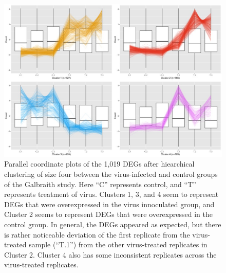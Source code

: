 \documentclass[11pt,a4paper,oldfontcommands,openany]{memoir}
\numberwithin{equation}{section} %
\begin{document}
\begin{figure}[H]
\centering
  \includegraphics[width=\textwidth]{../VirusHoneyBee/DESeq2/ClusterStandard/Clustering_data_FDR_05/C_T_4.jpg}
  \caption{Parallel coordinate plots of the 1,019 DEGs after hiearchical clustering of size four between the virus-infected and control groups of the Galbraith study. Here ``C'' represents control, and ``T'' represents treatment of virus. Clusters 1, 3, and 4 seem to represent DEGs that were overexpressed in the virus innoculated group, and Cluster 2 seems to represent DEGs that were overexpressed in the control group. In general, the DEGs appeared as expected, but there is rather noticeable deviation of the first replicate from the virus-treated sample (``T.1'') from the other virus-treated replicates in Cluster 2. Cluster 4 also has some inconsistent replicates across the virus-treated replicates.}
  \label{fig:pcpGalbraith}
\end{figure}
\end{document}
